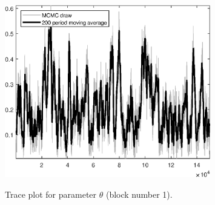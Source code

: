 \begin{figure}[H]
\centering
  \includegraphics[width=0.8\textwidth]{BRS_gen/graphs/TracePlot_theta_blck_1}\\
    \caption{Trace plot for parameter ${\theta}$ (block number 1).}
\end{figure}
